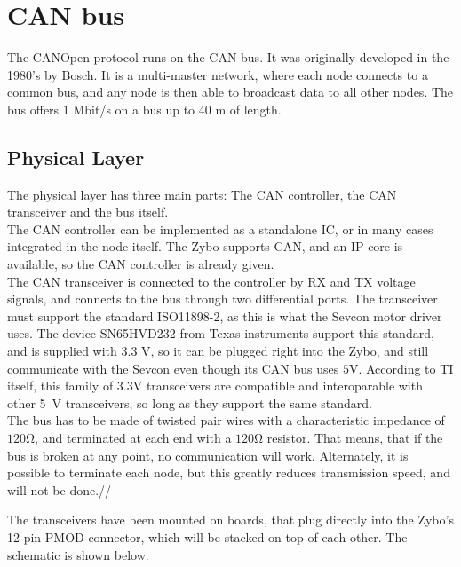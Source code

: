 
\section{CAN bus}\label{sec:CANbus}
The CANOpen protocol runs on the CAN bus.
It was originally developed in the 1980's by Bosch.
It is a multi-master network, where each node connects to a common bus, and any node is then able to broadcast data to all other nodes.
The bus offers 1 Mbit/s on a bus up to 40 m of length. 

\subsection{Physical Layer}\label{sub:CANphys}
The physical layer has three main parts: The CAN controller, the CAN transceiver and the bus itself. \\

The CAN controller can be implemented as a standalone IC, or in many cases integrated in the node itself.
The Zybo supports CAN, and an IP core is available, so the CAN controller is already given.\\

The CAN transceiver is connected to the controller by RX and TX voltage signals, and connects to the bus through two differential ports. 
The transceiver must support the standard ISO11898-2, as this is what the Sevcon motor driver uses.
The device SN65HVD232 from Texas instruments support this standard, and is supplied with 3.3 V, so it can be plugged right into the Zybo, and still communicate with the Sevcon even though its CAN bus uses $\si{5 \volt}$.
According to TI itself\cite{3.3V_CAN}, this family of $\si{3.3 \volt}$ transceivers are compatible and interoparable with other \si{5 \volt} transceivers, so long as they support the same standard.\\

The bus has to be made of twisted pair wires with a characteristic impedance of $\si{120 \ohm}$, and terminated at each end with a $\si{120 \ohm}$ resistor.
That means, that if the bus is broken at any point, no communication will work.
Alternately, it is possible to terminate each node, but this greatly reduces transmission speed, and will not be done.//

The transceivers have been mounted on boards, that plug directly into the Zybo's 12-pin PMOD connector, which will be stacked on top of each other. 
The schematic is shown below.

